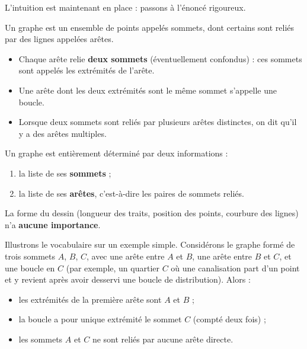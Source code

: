 \documentclass[11pt]{article}
\newcommand{\cle}[1]{{\popxbold\color{popdark}#1}}
\begin{document}
L'intuition est maintenant en place : passons à l'énoncé rigoureux.

\begin{definition}
Un \cle{graphe} est un ensemble de points appelés \cle{sommets}, dont certains sont reliés par des lignes appelées \cle{arêtes}.
\begin{itemize}
\item Chaque arête relie \textbf{deux sommets} (éventuellement confondus) : ces sommets sont appelés les \cle{extrémités} de l'arête.
\item Une arête dont les deux extrémités sont le même sommet s'appelle une \cle{boucle}.
\item Lorsque deux sommets sont reliés par plusieurs arêtes distinctes, on dit qu'il y a des \cle{arêtes multiples}.
\end{itemize}
\end{definition}

\begin{aretenir}
Un graphe est entièrement déterminé par deux informations :
\begin{enumerate}
\item la liste de ses \textbf{sommets} ;
\item la liste de ses \textbf{arêtes}, c'est-à-dire les paires de sommets reliés.
\end{enumerate}
La forme du dessin (longueur des traits, position des points, courbure des lignes) n'a \textbf{aucune importance}.
\end{aretenir}

Illustrons le vocabulaire sur un exemple simple. Considérons le graphe formé de trois sommets $A$, $B$, $C$, avec une arête entre $A$ et $B$, une arête entre $B$ et $C$, et une boucle en $C$ (par exemple, un quartier $C$ où une canalisation part d'un point et y revient après avoir desservi une boucle de distribution). Alors :

\begin{itemize}
\item les extrémités de la première arête sont $A$ et $B$ ;
\item la boucle a pour unique extrémité le sommet $C$ (compté deux fois) ;
\item les sommets $A$ et $C$ ne sont reliés par aucune arête directe.
\end{itemize}
\end{document}
